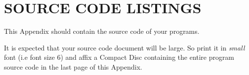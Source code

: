 \chapter{\large SOURCE CODE LISTINGS}

This Appendix should contain the source code of your programs.

It is expected that your source code document  will be large. So print it in \textit{small} font (i.e font size 6) and affix a Compact Disc containing the entire program source code in the last page of this Appendix. 